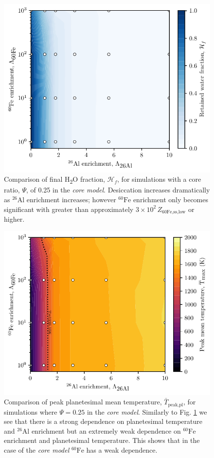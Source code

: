 \documentclass[fleqn,usenatbib]{mnras}
\newcommand{\rms}[1]{\ensuremath{_{\text{#1}}}}
\newcommand{\tsu}[1]{\textsubscript{#1}}
\newcommand{\atom}[2]{$^{#2}\text{#1}$}
\newcommand{\al}{\atom{Al}{26}}
\newcommand{\fe}{\atom{Fe}{60}}
\newcommand{\water}{{H\tsu{2}O}}
\newcommand{\waterfracHf}{\mathcal{H}_f}
\begin{document}
\begin{figure}
  \centering
  \includegraphics[scale=0.7]{assets/core-model-mix/0.25/des.pdf}
  \caption{Comparison of final \water{} fraction, $\waterfracHf$, for simulations with a core ratio, $\Psi$, of 0.25 in the \emph{core model}. Desiccation increases dramatically as \al{} enrichment increases; however \fe{} enrichment only becomes significant with greater than approximately $3 \times 10^2 \, Z\rms{60Fe,ss,low}$ or higher.}
  \label{fig:core-surface-des}
\end{figure}

\begin{figure}
  \centering
  \includegraphics[scale=0.7]{assets/core-model-mix/0.25/temp.pdf}
  \caption{Comparison of peak planetesimal mean temperature, $\bar{T}\rms{peak,pl}$, for simulations where $\Psi = 0.25$ in the \emph{core model}. Similarly to Fig. \ref{fig:core-surface-des} we see that there is a strong dependence on planetesimal temperature and \al{} enrichment but an extremely weak dependence on \fe{} enrichment and planetesimal temperature. This shows that in the case of the \emph{core model} \fe{} has a weak dependence.}
  \label{fig:core-surface-temp}
\end{figure}
\end{document}

